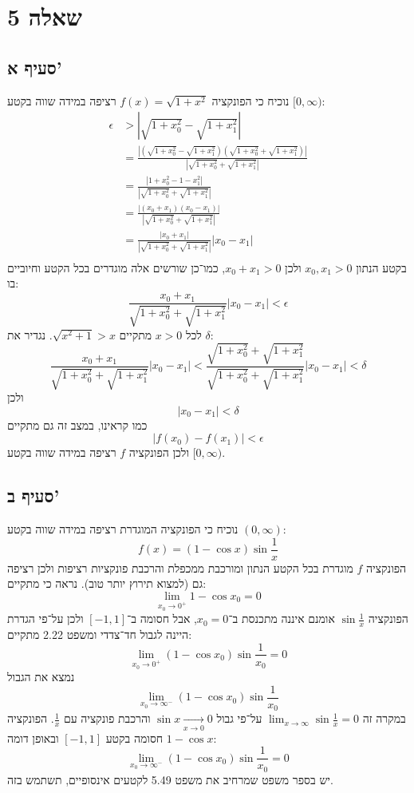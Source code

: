 \section{שאלה 5}
\subsection{סעיף א'}
נוכיח כי הפונקציה $f(x) = \sqrt{1 + x^2}$ רציפה במידה שווה בקטע $[0, \infty)$: %
\begin{align*}
	\epsilon & > \left| \sqrt{1 + x_0^2} - \sqrt{1 + x_1^2} \right| \\
	& = \frac{\left| \left( \sqrt{1 + x_0^2} - \sqrt{1 + x_1^2} \right) \left( \sqrt{1 + x_0^2} + \sqrt{1 + x_1^2} \right) \right|}
	{\left| \sqrt{1 + x_0^2} + \sqrt{1 + x_1^2} \right|} \\
	& = \frac{\left|  1 + x_0^2 - 1 - x_1^2 \right|} {\left| \sqrt{1 + x_0^2} + \sqrt{1 + x_1^2} \right|} \\
	& = \frac{\left|  (x_0 + x_1)(x_0 - x_1) \right|} {\left| \sqrt{1 + x_0^2} + \sqrt{1 + x_1^2} \right|} \\
	& = \frac{\left|  x_0 + x_1 \right|} {\left| \sqrt{1 + x_0^2} + \sqrt{1 + x_1^2} \right|} |x_0 - x_1| \\
\end{align*}
בקטע הנתון $x_0, x_1 > 0$ ולכן $x_0 + x_1 > 0$, כמו־כן שורשים אלה מוגדרים בכל הקטע וחיוביים בו:
\[
	\frac{x_0 + x_1} {\sqrt{1 + x_0^2} + \sqrt{1 + x_1^2}} |x_0 - x_1| < \epsilon
\]
לכל $x > 0$ מתקיים $\sqrt{x^2 + 1} > x$.
נגדיר את $\delta$:
\[
	\frac{x_0 + x_1} {\sqrt{1 + x_0^2} + \sqrt{1 + x_1^2}} |x_0 - x_1| < 
	\frac{\sqrt{1 + x_0^2} + \sqrt{1 + x_1^2}}{\sqrt{1 + x_0^2} + \sqrt{1 + x_1^2}} |x_0 - x_1| < \delta
\]
ולכן
\[
	|x_0 - x_1| < \delta
\]
כמו קראינו, במצב זה גם מתקיים
\[
	|f(x_0) - f(x_1)| < \epsilon
\]
ולכן הפונקציה $f$ רציפה במידה שווה בקטע $[0, \infty)$. %

\subsection{סעיף ב'}
נוכיח כי הפונקציה המוגדרת רציפה במידה שווה בקטע $(0, \infty)$:
\[
	f(x) = (1 - \cos x) \sin \frac{1}{x}
\]
הפונקציה $f$ מוגדרת בכל הקטע הנתון ומורכבת ממכפלת והרכבת פונקציות רציפות ולכן רציפה גם (למצוא תירוץ יותר טוב).
נראה כי מתקיים:
\[
	\lim_{x_0 \to 0^+} 1 - \cos x_0 = 0
\]
הפונקציה $\sin \frac{1}{x}$ אומנם איננה מתכנסת ב־$x_0 = 0$, אבל חסומה ב־$[-1, 1]$ ולכן על־פי הגדרת היינה לגבול חד־צדדי ומשפט 2.22 מתקיים:
\[
	\lim_{x_0 \to 0^+} (1 - \cos x_0) \sin \frac{1}{x_0} = 0
\]
נמצא את הגבול
\[
	\lim_{x_0 \to \infty^-} (1 - \cos x_0) \sin \frac{1}{x_0}
\]
במקרה זה $\lim_{x \to \infty} \sin \frac{1}{x} = 0$ על־פי גבול $\sin x \underset{x \to 0}{\to} 0$ והרכבת פונקציה עם $\frac{1}{x}$.
הפונקציה $1 - \cos x$ חסומה בקטע $[-1, 1]$ ובאופן דומה:
\[
	\lim_{x_0 \to \infty^-} (1 - \cos x_0) \sin \frac{1}{x_0} = 0
\]
יש בספר משפט שמרחיב את משפט 5.49 לקטעים אינסופיים, תשתמש בזה.

